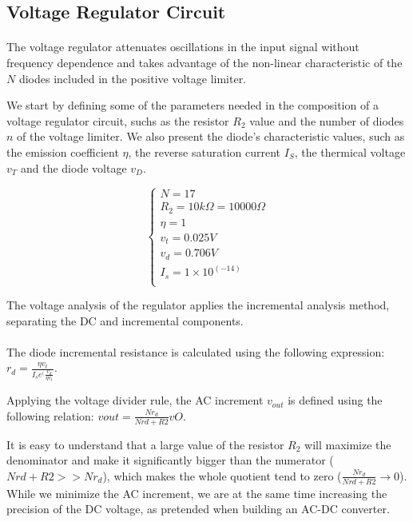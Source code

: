 \subsection{Voltage Regulator Circuit}
\label{subsec:regulator}

\paragraph{}
The voltage regulator attenuates oscillations in the input signal without frequency dependence and takes advantage of the non-linear characteristic of the $N$ diodes included in the positive voltage limiter. 

We start by defining some of the parameters needed in the composition of a voltage regulator circuit, suchs as the resistor $R_2$ value and the number of diodes $n$ of the voltage limiter. We also present the diode's characteristic values, such as the emission coefficient $\eta$, the reverse saturation current $I_S$, the thermical voltage $v_T$ and the diode voltage $v_D$.

\[
\left\{\begin{matrix}
N=17\\
R_2=10k\Omega=10 000\Omega\\
\eta=1\\
v_t=0.025 V\\
v_d=0.706 V\\
I_s=1\times10^(-14)\\
\end{matrix}\right.
\]


The voltage analysis of the regulator applies the incremental analysis method, separating the DC and incremental components.

\paragraph{}
The diode incremental resistance is calculated using the following expression: $r_d=\frac{\eta v_t}{I_s e^(\frac{v_d}{\eta v_t}}$.

Applying the voltage divider rule, the AC increment $v_{out}$ is defined using the following relation: $vout=\frac{N r_d}{N rd+R2}vO$.

It is easy to understand that a large value of the resistor $R_2$ will maximize the denominator and make it significantly bigger than the numerator ($N rd+R2 >> N r_d$), which makes the whole quotient tend to zero ($\frac{N r_d}{N rd+R2} \longrightarrow 0$). While we minimize the AC increment, we are at the same time increasing the precision of the DC voltage, as pretended when building an AC-DC converter.


